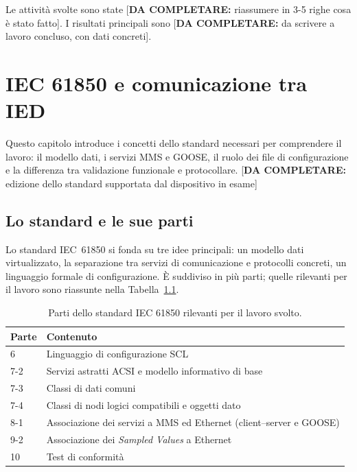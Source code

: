 \documentclass[11pt,a4paper,italian,oneside,openany]{book}
\newcommand{\daf}[1]{{\color{red}[\textbf{DA COMPLETARE:} #1]}}
\begin{document}
Le attività svolte sono state \daf{riassumere in 3-5 righe cosa è stato fatto}. I risultati principali sono \daf{da scrivere a lavoro concluso, con dati concreti}.

\chapter{IEC 61850 e comunicazione tra IED}\label{cap:standard}
Questo capitolo introduce i concetti dello standard necessari per comprendere il lavoro: il modello dati, i servizi MMS e GOOSE, il ruolo dei file di configurazione e la differenza tra validazione funzionale e protocollare. \daf{edizione dello standard supportata dal dispositivo in esame}

\section{Lo standard e le sue parti}
Lo standard IEC~61850 si fonda su tre idee principali: un modello dati virtualizzato, la separazione tra servizi di comunicazione e protocolli concreti, un linguaggio formale di configurazione. È suddiviso in più parti; quelle rilevanti per il lavoro sono riassunte nella Tabella~\ref{tab:parti}.

\begin{table}[htbp]
\centering
\begin{tabular}{@{}lp{10.5cm}@{}}
\toprule
\textbf{Parte} & \textbf{Contenuto} \\
\midrule
6 & Linguaggio di configurazione SCL \\
7-2 & Servizi astratti ACSI e modello informativo di base \\
7-3 & Classi di dati comuni \\
7-4 & Classi di nodi logici compatibili e oggetti dato \\
8-1 & Associazione dei servizi a MMS ed Ethernet (client--server e GOOSE) \\
9-2 & Associazione dei \textit{Sampled Values} a Ethernet \\
10 & Test di conformità \\
\bottomrule
\end{tabular}
\caption{Parti dello standard IEC 61850 rilevanti per il lavoro svolto.}
\label{tab:parti}
\end{table}
\end{document}
